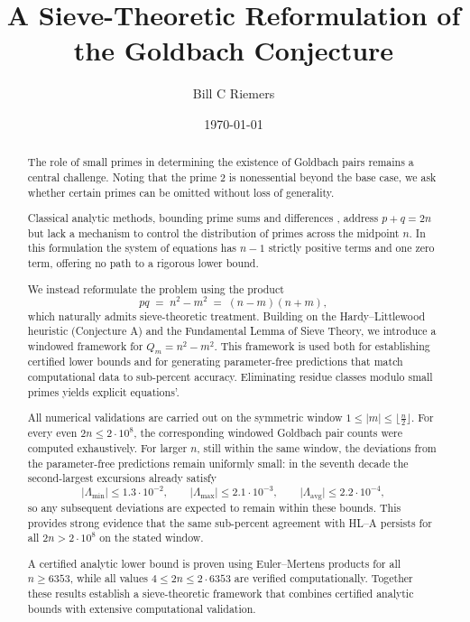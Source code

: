 \documentclass[11pt]{article}
\title{A Sieve-Theoretic Reformulation of the Goldbach Conjecture}
\author{Bill C Riemers}
\date{\today}
\theoremstyle{inline}
\theoremstyle{break}
\theoremstyle{break}
\theoremstyle{break}
\theoremstyle{break}
\theoremstyle{break}
\theoremstyle{inline}
\newcommand{\xMertens}{6353} %
\newcommand{\xLambdaMinLimit}{1.3\cdot 10^{-2}} %
\newcommand{\xLambdaMaxLimit}{2.1\cdot 10^{-3}} %
\newcommand{\xLambdaAvgLimit}{2.2\cdot 10^{-4}} %
\newcommand{\tavg}{{\scriptscriptstyle\mathrm{avg}}}
\begin{document}
\maketitle
\begin{abstract}
The role of small primes in determining the existence of Goldbach pairs \cite{GoldbachSurvey,Ribenboim1991} remains a central challenge. Noting that the prime \(2\) is nonessential beyond the base case, we ask whether certain primes can be omitted without loss of generality.  

Classical analytic methods, bounding prime sums and differences \cite{MontgomeryVaughan2007,Helfgott2013}, address \(p+q=2n\) but lack a mechanism to control the distribution of primes across the midpoint \(n\). In this formulation the system of equations has \(n-1\) strictly positive terms and one zero term, offering no path to a rigorous lower bound.  

We instead reformulate the problem using the product
\begin{equation}
pq \;=\; n^2 - m^2 \;=\; (n-m)(n+m),
\end{equation}
which naturally admits sieve-theoretic treatment. Building on the Hardy–Littlewood heuristic (Conjecture A) \cite{HardyLittlewood1923} and the Fundamental Lemma of Sieve Theory, we introduce a windowed framework for
\(
Q_m = n^2 - m^2
\).
This framework is used both for establishing certified lower bounds and for generating parameter-free predictions that match computational data to sub-percent accuracy.   Eliminating residue classes modulo small primes yields explicit equations'.

All numerical validations are carried out on the symmetric window \(1 \le \lvert m \rvert \le \lfloor \frac{n}{2} \rfloor\). For every even \(2n \le 2\cdot 10^8\), 
the corresponding windowed Goldbach pair counts were computed exhaustively. For larger \(n\), still within the same window, the deviations from the 
parameter-free predictions remain uniformly small: in the seventh decade the second-largest excursions already satisfy
\[
  \lvert \Lambda_{\min} \rvert \le \xLambdaMinLimit,\qquad
  \lvert \Lambda_{\max} \rvert \le \xLambdaMaxLimit,\qquad
  \lvert \Lambda_{\tavg} \rvert \le \xLambdaAvgLimit,
\]
so any subsequent deviations are expected to remain within these bounds. This provides strong evidence that the same sub-percent agreement with HL–A 
persists for all \(2n > 2\cdot 10^8\) on the stated window.

A certified analytic lower bound is proven using Euler–Mertens products\cite{Mertens1874,MontgomeryVaughan2007,RosserSchoenfeld1962,Dusart2010} for all \(n \ge \xMertens\), while all values \(4 \le 2n \le 2\cdot\xMertens\) are verified computationally. Together these results establish a sieve-theoretic framework that combines certified analytic bounds with extensive computational validation.
\end{abstract}
\end{document}
